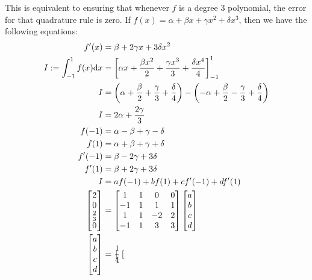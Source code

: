 \documentclass{article}
\begin{document}
\bigskip
\begin{prob}
\end{prob}
This is equivalent to ensuring that whenever $f$ is a degree 3 polynomial,
the error for that quadrature rule is zero. If $f(x)=\alpha +\beta x + \gamma x^2 + \delta x^3$, then we have the following equations: \begin{align*}
    f'(x) &= \beta + 2 \gamma x + 3 \delta x^2 \\
    I := \int_{-1}^1 f(x) \mathrm{d} x &= \left[ \alpha x + \frac{\beta x^2}{2} + \frac{\gamma x^3}{3} + \frac{\delta x^4}{4} \right]_{-1}^1 \\
    I &= \left( \alpha + \frac{\beta}{2} + \frac{\gamma}{3} + \frac{\delta}{4} \right) - \left( -\alpha + \frac{\beta}{2} - \frac{\gamma}{3} + \frac{\delta}{4} \right) \\
    I &= 2\alpha + \frac{2\gamma}{3} \\
    f(-1) &= \alpha - \beta + \gamma - \delta \\
    f(1) &= \alpha + \beta + \gamma + \delta \\
    f'(-1) &= \beta - 2 \gamma + 3 \delta \\
    f'(1) &= \beta + 2 \gamma + 3 \delta \\
    I &= a f(-1) + b f(1) + c f'(-1) + d f'(1) \\
    \begin{bmatrix}
        2 \\
        0 \\
        \frac{2}{3} \\
        0
    \end{bmatrix} &= \begin{bmatrix}
    1 & 1 & 0 & 0 \\
    -1 & 1 & 1 & 1 \\
    1 & 1 & -2 & 2 \\
    -1 & 1 & 3 & 3
    \end{bmatrix} \begin{bmatrix}
        a \\
        b \\
        c \\
        d
    \end{bmatrix} \\
    \begin{bmatrix}
        a \\
        b \\
        c \\
        d
    \end{bmatrix} &= \frac{1}{4} \begin{bmatrix}

\end{bmatrix}
\end{align*}
\end{document}
